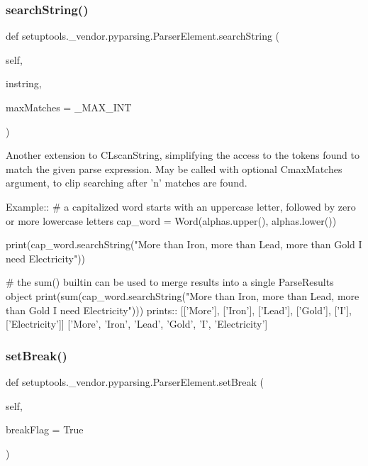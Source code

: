 \subsubsection{\texorpdfstring{search\+String()}{searchString()}}
{\footnotesize\ttfamily def setuptools.\+\_\+vendor.\+pyparsing.\+Parser\+Element.\+search\+String (\begin{DoxyParamCaption}\item[{}]{self,  }\item[{}]{instring,  }\item[{}]{max\+Matches = {\ttfamily \+\_\+MAX\+\_\+INT} }\end{DoxyParamCaption})}

\begin{DoxyVerb}Another extension to C{L{scanString}}, simplifying the access to the tokens found
to match the given parse expression.  May be called with optional
C{maxMatches} argument, to clip searching after 'n' matches are found.

Example::
    # a capitalized word starts with an uppercase letter, followed by zero or more lowercase letters
    cap_word = Word(alphas.upper(), alphas.lower())
    
    print(cap_word.searchString("More than Iron, more than Lead, more than Gold I need Electricity"))

    # the sum() builtin can be used to merge results into a single ParseResults object
    print(sum(cap_word.searchString("More than Iron, more than Lead, more than Gold I need Electricity")))
prints::
    [['More'], ['Iron'], ['Lead'], ['Gold'], ['I'], ['Electricity']]
    ['More', 'Iron', 'Lead', 'Gold', 'I', 'Electricity']
\end{DoxyVerb}
 \mbox{\label{classsetuptools_1_1__vendor_1_1pyparsing_1_1ParserElement_a1f7a4070fece9d0194863d4dc41cd830}} 
\subsubsection{\texorpdfstring{set\+Break()}{setBreak()}}
{\footnotesize\ttfamily def setuptools.\+\_\+vendor.\+pyparsing.\+Parser\+Element.\+set\+Break (\begin{DoxyParamCaption}\item[{}]{self,  }\item[{}]{break\+Flag = {\ttfamily True} }\end{DoxyParamCaption})}

